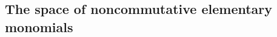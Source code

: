 \documentclass{amsart}
\theoremstyle{definition}
\theoremstyle{remark}
\numberwithin{equation}{subsection}
\newcommand{\wof}[1]{w_{#1}}
\newcommand{\wtt}{\mathtt{wt}}
\newcommand{\dsch}{\ensuremath{\Xi}}
\newcommand{\dcoma}{\mathcal{D}}
\newcommand{\code}{\mathfrak{c}}
\begin{document}





\subsection{The space of noncommutative elementary monomials}
\newcommand{\RRC}{\widetilde{\BRC}}
\end{document}
